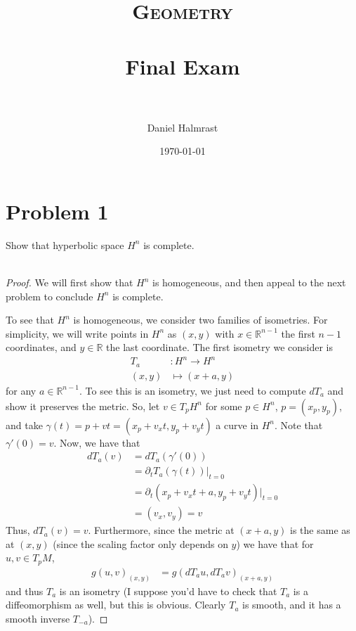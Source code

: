 \documentclass[fontsize=11pt]{scrartcl} %
\title{	
\normalfont \normalsize 
\textsc{Geometry} \\ [25pt] %
\horrule{0.5pt} \\[0.4cm] %
\huge Final Exam \\ %
\horrule{2pt} \\[0.5cm] %
}
\author{Daniel Halmrast} %
\date{\normalsize\today} %
\numberwithin{equation}{section} %
\numberwithin{figure}{section} %
\numberwithin{table}{section} %
\newcommand{\R}{\mathbb{R}}
\begin{document}
\maketitle %

\section*{Problem 1}
Show that hyperbolic space $H^n$ is complete.
\\
\\
\begin{proof}
    We will first show that $H^n$ is homogeneous, and then appeal to the next
    problem to conclude $H^n$ is complete.

    To see that $H^n$ is homogeneous, we consider two families of isometries.
    For simplicity, we will write points in $H^n$ as $(x,y)$ with $x\in
    \R^{n-1}$ the first $n-1$ coordinates, and $y\in\R$ the last coordinate.
    The first isometry we consider is
    \[
        \begin{aligned}
        T_a&:H^n\to H^n\\
        (x,y)&\mapsto(x+a,y)
    \end{aligned}
    \]
    for any $a\in\R^{n-1}$. To see this is an isometry, we just need to compute
    $dT_a$ and show it preserves the metric. So, let $v\in T_pH^n$ for some
    $p\in H^n$, $p=(x_p,y_p)$, and take $\gamma(t) = p+vt = (x_p+v_xt,y_p+v_yt)$
    a curve in $H^n$.  Note that $\gamma'(0) = v$. Now, we have that
    \[
        \begin{aligned}
        dT_a(v) &= dT_a(\gamma'(0))\\
        &= \partial_t T_a(\gamma(t))|_{t=0}\\
        &=\partial_t (x_p +v_xt+a,y_p+v_yt)|_{t=0}\\
        &=(v_x,v_y) = v
    \end{aligned}
    \]
    Thus, $dT_a(v)=v$. Furthermore, since the metric at $(x+a,y)$ is the same as
    at $(x,y)$ (since the scaling factor only depends on $y$) we have that for
    $u,v\in T_pM$,
    \[
\begin{aligned}
    g(u,v)_{(x,y)} &= g(dT_au,dT_av)_{(x+a,y)}
\end{aligned}
    \]
    and thus $T_a$ is an isometry (I suppose you'd have to check that $T_a$ is a
        diffeomorphism as well, but this is obvious. Clearly $T_a$ is smooth,
    and it has a smooth inverse $T_{-a}$).


\end{proof}
\end{document}
